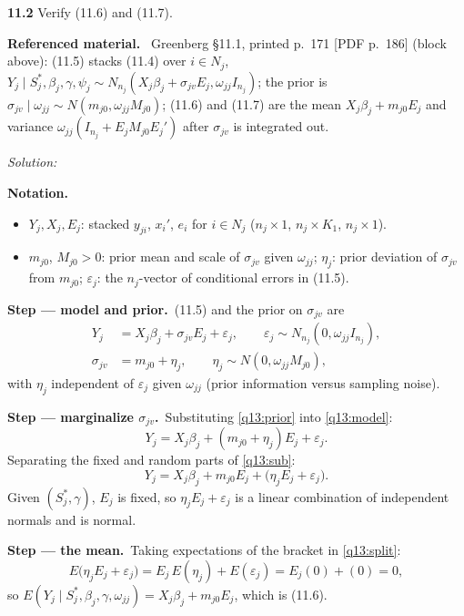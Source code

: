 \documentclass[11pt,a4paper]{article}
\newif\ifsolucoes
\newcommand{\espacoresol}{4.5cm}   %
\newenvironment{refmaterial}{\par\smallskip\noindent\begingroup\small\textbf{Referenced material.}~}{\endgroup\par\smallskip}
\newenvironment{notacao}{\par\smallskip\noindent\textbf{Notation.}\begin{itemize}[leftmargin=1.4em,topsep=1pt,itemsep=0pt]\small}{\end{itemize}}
\newcommand{\resolespaco}{\ifsolucoes\else\par\textit{Solution:}\vspace{\espacoresol}\par\fi}
\newcommand{\passo}[2]{\par\smallskip\noindent\textbf{Step --- #1.}~#2}
\begin{document}
\noindent\textbf{11.2} Verify (11.6) and (11.7).
\begin{refmaterial}
Greenberg \S11.1, printed p.~171 [PDF p.~186] (block above): (11.5) stacks (11.4) over $i\in N_j$,
$Y_j\mid S_j^*,\beta_j,\gamma,\psi_j\sim N_{n_j}(X_j\beta_j+\sigma_{jv}E_j,\omega_{jj}I_{n_j})$; the prior is
$\sigma_{jv}\mid\omega_{jj}\sim N(m_{j0},\omega_{jj}M_{j0})$; (11.6) and (11.7) are the mean
$X_j\beta_j+m_{j0}E_j$ and variance $\omega_{jj}(I_{n_j}+E_jM_{j0}E_j')$ after $\sigma_{jv}$ is integrated out.
\end{refmaterial}
\resolespaco
\begin{sol}
\begin{notacao}
\item $Y_j,X_j,E_j$: stacked $y_{ji}$, $x_i'$, $e_i$ for $i\in N_j$ ($n_j\times1$, $n_j\times K_1$, $n_j\times1$).
\item $m_{j0}$, $M_{j0}>0$: prior mean and scale of $\sigma_{jv}$ given $\omega_{jj}$; $\eta_j$: prior
deviation of $\sigma_{jv}$ from $m_{j0}$; $\varepsilon_j$: the $n_j$-vector of conditional errors in (11.5).
\end{notacao}

\passo{model and prior}{(11.5) and the prior on $\sigma_{jv}$ are
\begin{align}
Y_j&=X_j\beta_j+\sigma_{jv}E_j+\varepsilon_j,\qquad\varepsilon_j\sim N_{n_j}(0,\omega_{jj}I_{n_j}),\label{q13:model}\\
\sigma_{jv}&=m_{j0}+\eta_j,\qquad\eta_j\sim N(0,\omega_{jj}M_{j0}),\label{q13:prior}
\end{align}
with $\eta_j$ independent of $\varepsilon_j$ given $\omega_{jj}$ (prior information versus sampling noise).}

\passo{marginalize $\sigma_{jv}$}{Substituting \eqref{q13:prior} into \eqref{q13:model}:
\begin{equation}
Y_j=X_j\beta_j+(m_{j0}+\eta_j)E_j+\varepsilon_j.\label{q13:sub}
\end{equation}
Separating the fixed and random parts of \eqref{q13:sub}:
\begin{equation}
Y_j=X_j\beta_j+m_{j0}E_j+\big(\eta_jE_j+\varepsilon_j\big).\label{q13:split}
\end{equation}
Given $(S_j^*,\gamma)$, $E_j$ is fixed, so $\eta_jE_j+\varepsilon_j$ is a linear combination of independent
normals and is normal.}

\passo{the mean}{Taking expectations of the bracket in \eqref{q13:split}:
\begin{equation}
E\big(\eta_jE_j+\varepsilon_j\big)=E_j\,E(\eta_j)+E(\varepsilon_j)=E_j(0)+(0)=0,\label{q13:mean}
\end{equation}
so $E(Y_j\mid S_j^*,\beta_j,\gamma,\omega_{jj})=X_j\beta_j+m_{j0}E_j$, which is (11.6).}


\end{sol}
\end{document}
